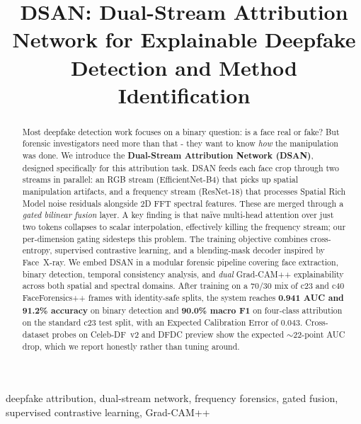 \documentclass[conference]{IEEEtran}
\begin{document}
\title{DSAN: Dual-Stream Attribution Network for Explainable Deepfake Detection and Method Identification}

\author{
}

\maketitle

\begin{abstract}
Most deepfake detection work focuses on a binary question: is a face real or fake? But forensic investigators need more than that - they want to know \textit{how} the manipulation was done. We introduce the \textbf{Dual-Stream Attribution Network (DSAN)}, designed specifically for this attribution task. DSAN feeds each face crop through two streams in parallel: an RGB stream (EfficientNet-B4) that picks up spatial manipulation artifacts, and a frequency stream (ResNet-18) that processes Spatial Rich Model noise residuals alongside 2D FFT spectral features. These are merged through a \textit{gated bilinear fusion} layer. A key finding is that na\"ive multi-head attention over just two tokens collapses to scalar interpolation, effectively killing the frequency stream; our per-dimension gating sidesteps this problem. The training objective combines cross-entropy, supervised contrastive learning, and a blending-mask decoder inspired by Face~X-ray. We embed DSAN in a modular forensic pipeline covering face extraction, binary detection, temporal consistency analysis, and \textit{dual} Grad-CAM++ explainability across both spatial and spectral domains. After training on a 70/30 mix of c23 and c40 FaceForensics++ frames with identity-safe splits, the system reaches \textbf{0.941 AUC and 91.2\% accuracy} on binary detection and \textbf{90.0\% macro F1} on four-class attribution on the standard c23 test split, with an Expected Calibration Error of 0.043. Cross-dataset probes on Celeb-DF~v2 and DFDC preview show the expected $\sim$22-point AUC drop, which we report honestly rather than tuning around.
\end{abstract}

\begin{IEEEkeywords}
deepfake attribution, dual-stream network, frequency forensics, gated fusion, supervised contrastive learning, Grad-CAM++
\end{IEEEkeywords}










\end{document}
